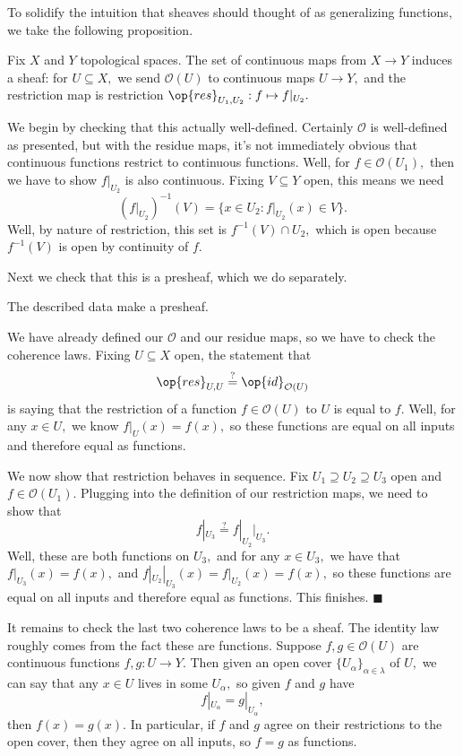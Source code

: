 To solidify the intuition that sheaves should thought of as generalizing functions, we take the following proposition.
\begin{proposition}
    Fix $X$ and $Y$ topological spaces. The set of continuous maps from $X\to Y$ induces a sheaf: for $U\subseteq X,$ we send $\mathcal O(U)$ to continuous maps $U\to Y,$ and the restriction map is restriction $\op{res}_{U_1,U_2}:f\mapsto f|_{U_2}.$
\end{proposition}
We begin by checking that this actually well-defined. Certainly $\mathcal O$ is well-defined as presented, but with the residue maps, it's not immediately obvious that continuous functions restrict to continuous functions. Well, for $f\in\mathcal O(U_1),$ then we have to show $f|_{U_2}$ is also continuous. Fixing $V\subseteq Y$ open, this means we need
\[\left(f|_{U_2}\right)^{-1}(V)=\{x\in U_2:f|_{U_2}(x)\in V\}.\]
Well, by nature of restriction, this set is $f^{-1}(V)\cap U_2,$ which is open because $f^{-1}(V)$ is open by continuity of $f.$

Next we check that this is a presheaf, which we do separately.
\begin{lemma}
    The described data make a presheaf.
\end{lemma}
We have already defined our $\mathcal O$ and our residue maps, so we have to check the coherence laws. Fixing $U\subseteq X$ open, the statement that
\[\op{res}_{U,U}\stackrel?=\op{id}_{\mathcal O(U)}\]
is saying that the restriction of a function $f\in\mathcal O(U)$ to $U$ is equal to $f.$ Well, for any $x\in U,$ we know $f|_U(x)=f(x),$ so these functions are equal on all inputs and therefore equal as functions.

We now show that restriction behaves in sequence. Fix $U_1\supseteq U_2\supseteq U_3$ open and $f\in\mathcal O(U_1).$ Plugging into the definition of our restriction maps, we need to show that
\[f|_{U_3}\stackrel?=f|_{U_2}|_{U_3}.\]
Well, these are both functions on $U_3,$ and for any $x\in U_3,$ we have that $f|_{U_3}(x)=f(x),$ and $f|_{U_2}|_{U_3}(x)=f|_{U_2}(x)=f(x),$ so these functions are equal on all inputs and therefore equal as functions. This finishes. $\blacksquare$

It remains to check the last two coherence laws to be a sheaf. The identity law roughly comes from the fact these are functions. Suppose $f,g\in\mathcal O(U)$ are continuous functions $f,g:U\to Y.$ Then given an open cover $\{U_\alpha\}_{\alpha\in\lambda}$ of $U,$ we can say that any $x\in U$ lives in some $U_\alpha,$ so given $f$ and $g$ have
\[f|_{U_\alpha}=g|_{U_\alpha},\]
then $f(x)=g(x).$ In particular, if $f$ and $g$ agree on their restrictions to the open cover, then they agree on all inputs, so $f=g$ as functions.


